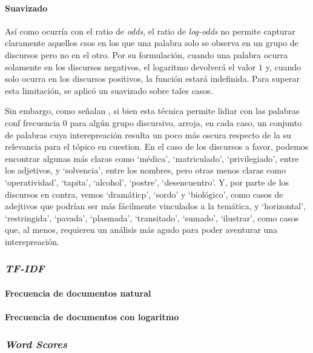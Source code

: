 \paragraph{Suavizado}
Así como ocurría con el ratio de \textit{odds}, el ratio de \textit{log-odds} no
permite capturar claramente aquellos csos en los que una palabra solo se observa en
un grupo de discursos pero no en el otro. Por su formulación, cuando una palabra
ocurra solamente en los discursos negativos, el logaritmo devolverá el valor $1$ y,
cuando solo ocurra en los discursos positivos, la función estará indefinida. Para
superar esta limitación, se aplicó un suavizado sobre tales casos.
\par
Sin embargo, como señalan \cite{monroe2008fightin}, si bien esta técnica permite
lidiar con las palabras conf frecuencia $0$ para algún grupo discursivo, arroja,
en cada caso, un conjunto de palabras cuya interepreación resulta un poco más
oscura respecto de la su relevancia para el tópico en cuestion. En el caso
de los discursos a favor, podemos encontrar algunas más claras como `médica',
`matriculado', `privilegiado', entre los adjetivos, y `solvencia', entre los nombres,
pero otras menos claras como `operatividad', `tapita', `alcohol', `postre',
`desencuentro'. Y, por parte de los discursos en contra, vemos `dramáticp', `sordo' y
`biológico', como casos de adejtivos que podrían ser más fácilmente vinculados a la
temática, y `horizontal', `restringida', `pavada', `plasmada', `transitado', `sumado',
`ilustrar', como casos que, al menos, requieren un análisis más agudo para poder
aventurar una interepreación.

\subsubsection{\textit{TF-IDF}}

\paragraph{Frecuencia de documentos natural}

\paragraph{Frecuencia de documentos con logaritmo}

\subsubsection{\textit{Word Scores}}

